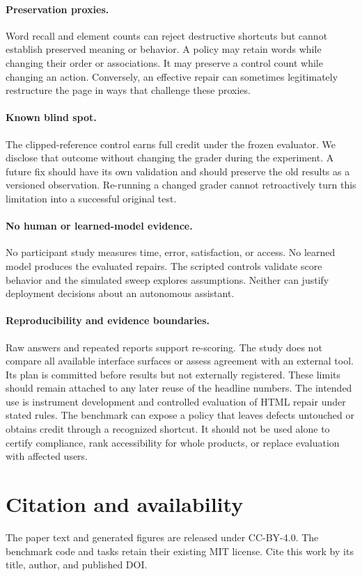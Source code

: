 \documentclass{article}
\begin{document}
\paragraph{Preservation proxies.} Word recall and element counts can reject destructive shortcuts but cannot establish preserved meaning or behavior. A policy may retain words while changing their order or associations. It may preserve a control count while changing an action. Conversely, an effective repair can sometimes legitimately restructure the page in ways that challenge these proxies.
\paragraph{Known blind spot.} The clipped-reference control earns full credit under the frozen evaluator. We disclose that outcome without changing the grader during the experiment. A future fix should have its own validation and should preserve the old results as a versioned observation. Re-running a changed grader cannot retroactively turn this limitation into a successful original test.
\paragraph{No human or learned-model evidence.} No participant study measures time, error, satisfaction, or access. No learned model produces the evaluated repairs. The scripted controls validate score behavior and the simulated sweep explores assumptions. Neither can justify deployment decisions about an autonomous assistant.
\paragraph{Reproducibility and evidence boundaries.} Raw answers and repeated reports support re-scoring. The study does not compare all available interface surfaces or assess agreement with an external tool. Its plan is committed before results but not externally registered. These limits should remain attached to any later reuse of the headline numbers.
The intended use is instrument development and controlled evaluation of HTML repair under stated rules. The benchmark can expose a policy that leaves defects untouched or obtains credit through a recognized shortcut. It should not be used alone to certify compliance, rank accessibility for whole products, or replace evaluation with affected users.


\section{Citation and availability}
The paper text and generated figures are released under CC-BY-4.0. The benchmark code and tasks retain their existing MIT license. Cite this work by its title, author, and published DOI.
\end{document}
